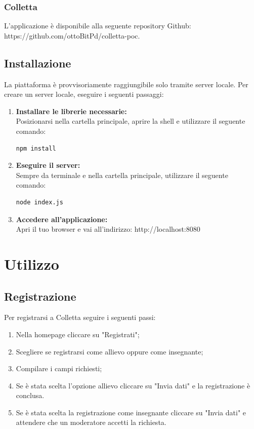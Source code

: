 \documentclass[11pt,a4paper]{article}
\begin{document}
{	\subsubsection{Colletta}		
	L'applicazione è disponibile alla seguente repository Github:
	https://github.com/ottoBitPd/colletta-poc.
	
	\subsection{Installazione}
	La piattaforma è provvisoriamente raggiungibile solo tramite server locale.
	Per creare un server locale, eseguire i seguenti passaggi:
	 \begin{enumerate}
	 	\item \textbf{Installare le librerie necessarie:}\\ Posizionarsi nella cartella principale, aprire la shell e utilizzare il seguente comando:\begin{lstlisting}[numbers=none]
	 	npm install
	 	\end{lstlisting}
	 	\item \textbf{Eseguire il server:}\\ Sempre da terminale e nella cartella principale, utilizzare il seguente comando:\begin{lstlisting}[numbers=none]
	 	node index.js
	 	\end{lstlisting}
	 	\item \textbf{Accedere all'applicazione:}\\ Apri il tuo browser e vai all'indirizzo: http://localhost:8080
	 \end{enumerate}
 
 \newpage
	\section{Utilizzo}	
	
	\subsection{Registrazione}
	Per registrarsi a Colletta seguire i seguenti passi:
	\begin{enumerate}
	\item Nella homepage cliccare su "Registrati";
	\item Scegliere se registrarsi come allievo oppure come insegnante;
	\item Compilare i campi richiesti;
	\item Se è stata scelta l'opzione allievo cliccare su "Invia dati" e la registrazione è conclusa.
	\item Se è stata scelta la registrazione come insegnante cliccare su "Invia dati" e attendere che un moderatore accetti la richiesta.
	\end{enumerate}

}
\end{document}
